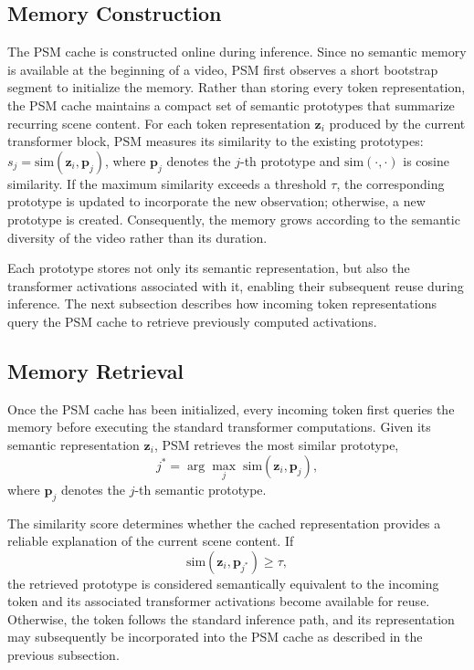 \documentclass[letterpaper]{article}
\begin{document}
\subsection{Memory Construction} 
The PSM cache is constructed online during inference. Since no semantic memory is
available at the beginning of a video, PSM first observes a short
bootstrap segment to initialize the memory. Rather than storing every
token representation, the PSM cache maintains a compact set of semantic prototypes
that summarize recurring scene content.
%
For each token representation $\mathbf{z}_i$ produced by the current
transformer block, PSM measures its similarity to the existing
prototypes: $s_j = \mathrm{sim}(\mathbf{z}_i,\mathbf{p}_j)$,
where $\mathbf{p}_j$ denotes the $j$-th prototype and
$\mathrm{sim}(\cdot,\cdot)$ is cosine similarity.
%
If the maximum similarity exceeds a threshold $\tau$, the corresponding
prototype is updated to incorporate the new observation; otherwise, a new
prototype is created. Consequently, the memory grows according to the
semantic diversity of the video rather than its duration.
 
Each prototype stores not only its semantic representation, but also the
transformer activations associated with it, enabling their subsequent
reuse during inference. The next subsection describes how incoming token
representations query the PSM cache to retrieve previously computed activations.
 
 
 
\subsection{Memory Retrieval}
 
Once the PSM cache has been initialized, every incoming token first queries the
memory before executing the standard transformer computations. Given its
semantic representation $\mathbf{z}_i$, PSM retrieves the most
similar prototype,
%
\begin{equation}
j^*=\arg\max_j \; \mathrm{sim}(\mathbf{z}_i,\mathbf{p}_j),
\end{equation}
%
where $\mathbf{p}_j$ denotes the $j$-th semantic prototype.
 
The similarity score determines whether the cached representation
provides a reliable explanation of the current scene content. If
%
\begin{equation}
\mathrm{sim}(\mathbf{z}_i,\mathbf{p}_{j^*}) \ge \tau,
\end{equation}
%
the retrieved prototype is considered semantically equivalent to the
incoming token and its associated transformer activations become
available for reuse. Otherwise, the token follows the standard inference
path, and its representation may subsequently be incorporated into the PSM cache as
described in the previous subsection.
 
\end{document}

